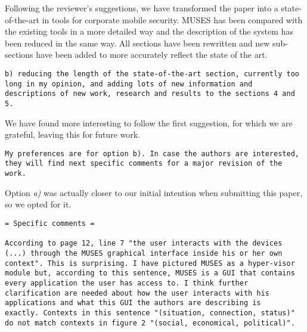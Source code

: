 \documentclass[preprint]{elsarticle}
\begin{document}
{Following the reviewer's suggestions, we have transformed the paper
into a state-of-the-art in tools for corporate mobile security. MUSES
has been compared with the existing tools in a more detailed way and
the description of the system has been reduced in the same way. All
sections have been rewritten and new sub-sections have been added to
more accurately reflect the state of the art. 


\begin{verbatim}
b) reducing the length of the state-of-the-art section, currently too
long in my opinion, and adding lots of new information and
descriptions of new work, research and results to the sections 4 and
5. 
\end{verbatim}

We have found more interesting to follow the first suggestion, for
which we are grateful, leaving this for future work.

\begin{verbatim}
My preferences are for option b). In case the authors are interested,
they will find next specific comments for a major revision of the
work.
\end{verbatim}

Option {\em a)} was actually closer to our initial intention when
submitting this paper, so we opted for it. 

\begin{verbatim}
= Specific comments =

According to page 12, line 7 "the user interacts with the devices
(...) through the MUSES graphical interface inside his or her own
context". This is surprising. I have pictured MUSES as a hyper-visor
module but, according to this sentence, MUSES is a GUI that contains
every application the user has access to. I think further
clarification are needed about how the user interacts with his
applications and what this GUI the authors are describing is
exactly. Contexts in this sentence "(situation, connection, status)"
do not match contexts in figure 2 "(social, economical, political)".
\end{verbatim}


}
\end{document}
